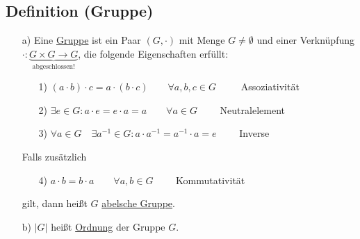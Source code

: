\documentclass[12pt,titlepage, pdf]{article}
\newcommand{\uline}[1]{\underline{#1}}
\renewcommand{\>}{\rightarrow}
\renewcommand{\*}{\cdot}
\begin{document}
\subsection{Definition (Gruppe)}
\begin{itemize}
	\item[a)] Eine \uline{Gruppe} ist ein Paar $(G, \cdot) $ mit Menge $G \neq \emptyset$ und einer Verknüpfung $\cdot : \underbrace{G \times G \rightarrow G}_{\text{abgeschlossen!}}$, die folgende Eigenschaften erfüllt:
	      \begin{itemize}
	      	\item[1)] $(a \cdot b) \cdot c = a \cdot (b \cdot c) \qquad \forall a,b,c \in G\qquad~$ Assoziativität
	      	\item[2)] $\exists e \in G: a \cdot e = e \cdot a = a \qquad \forall a \in G\qquad$ Neutralelement
	      	\item[3)] $\forall a \in G\quad \exists a^{-1} \in G: a \cdot a^{-1} = a^{-1}\*a = e\qquad$ Inverse
	      \end{itemize}
	      Falls zusätzlich 
	      \begin{itemize}
	      	\item[4)] $a \cdot b = b \cdot a \qquad  \forall a,b \in G\qquad$ Kommutativität \end{itemize}
	      	      gilt, dann heißt $G$ \uline{abelsche Gruppe}.
	      	      		
	      	\item[b)] $| G |$ heißt \uline{Ordnung} der Gruppe $G$.
	      \end{itemize}
\end{document}
